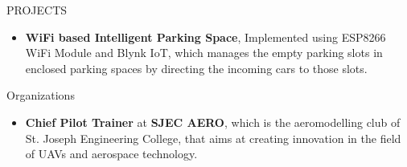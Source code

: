 \documentclass{resume} %
\begin{document}
\begin{rSection}{PROJECTS}
\begin{itemize}
        \item \textbf{WiFi based Intelligent Parking Space}{, Implemented using ESP8266 WiFi Module and Blynk IoT, which manages the empty parking slots in enclosed parking spaces by directing the incoming cars to those slots.}
    \end{itemize}

\end{rSection}


\begin{rSection}{Organizations}
    \begin{itemize}

        \item 	\textbf{Chief Pilot Trainer} at \textbf{SJEC AERO}, which is the aeromodelling club of St. Joseph Engineering College, that aims at creating innovation in the field of UAVs and aerospace technology.




    \end{itemize}


\end{rSection}


\end{document}
